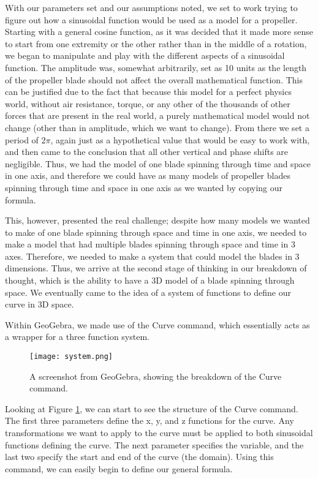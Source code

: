 With our parameters set and our assumptions noted, we set to work trying to figure out how a sinusoidal function would be used as a model for a propeller. Starting with a general cosine function, as it was decided that it made more sense to start from one extremity or the other rather than in the middle of a rotation, we began to manipulate and play with the different aspects of a sinusoidal function. The amplitude was, somewhat arbitrarily, set as 10 units as the length of the propeller blade should not affect the overall mathematical function. This can be justified due to the fact that because this model for a perfect physics world, without air resistance, torque, or any other of the thousands of other forces that are present in the real world, a purely mathematical model would not change (other than in amplitude, which we want to change). From there we set a period of \(2\pi\), again just as a hypothetical value that would be easy to work with, and then came to the conclusion that all other vertical and phase shifts are negligible. Thus, we had the model of one blade spinning through time and space in one axis, and therefore we could have as many models of propeller blades spinning through time and space in one axis as we wanted by copying our formula. 

This, however, presented the real challenge; despite how many models we wanted to make of one blade spinning through space and time in one axis, we needed to make a model that had multiple blades spinning through space and time in 3 axes. Therefore, we needed to make a system that could model the blades in 3 dimensions. Thus, we arrive at the second stage of thinking in our breakdown of thought, which is the ability to have a 3D model of a blade spinning through space. We eventually came to the idea of a system of functions to define our curve in 3D space.

Within GeoGebra, we made use of the Curve command, which essentially acts as a wrapper for a three function system.
\begin{figure}[ht]
\texttt{[image: system.png]}
\caption{A screenshot from GeoGebra, showing the breakdown of the Curve command.}
\label{fig:system}
\end{figure}

Looking at Figure \ref{fig:system}, we can start to see the structure of the Curve command. The first three parameters define the x, y, and z functions for the curve. Any transformations we want to apply to the curve must be applied to both sinusoidal functions defining the curve. The next parameter specifies the variable, and the last two specify the start and end of the curve (the domain). Using this command, we can easily begin to define our general formula.

